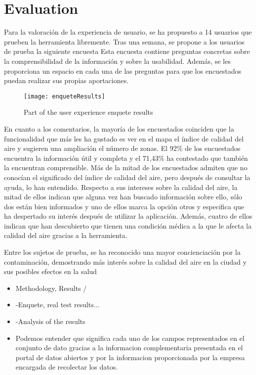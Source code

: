 \newpage
\section{Evaluation}
Para la valoración de la experiencia de usuario, se ha propuesto a 14 usuarios que prueben la herramienta libremente. 
Tras una semana, se propone a los usuarios de prueba la siguiente encuesta
Esta encuesta contiene preguntas concretas sobre la comprensibilidad de la información y sobre la usabilidad. Además, 
se les proporciona un espacio en cada una de las preguntas para que los encuestados puedan realizar sus propias aportaciones. 

\begin{figure}[ht]
   \centering
   \texttt{[image: enqueteResults]}
   \caption{Part of the user experience enquete results}
\end{figure}

En cuanto a los comentarios, la mayoría de los encuestados coinciden que la funcionalidad que más les ha gustado es ver en el 
mapa el índice de calidad del aire y sugieren una ampliación el número de zonas.
El 92\% de los encuestados encuentra la información útil y completa y el 71,43\% ha contestado que también la encuentran 
comprensible.
Más de la mitad de los encuestados admiten que no conocían el significado del índice de calidad del aire, pero después de 
consultar la ayuda, lo han entendido.
Respecto a sus intereses sobre la calidad del aire, la mitad de ellos indican que alguna vez han buscado información sobre ello, 
sólo dos están bien informados y uno de ellos marca la opción otros y especifica que ha despertado su interés después de utilizar 
la aplicación.
Además, cuatro de ellos indican que han descubierto que tienen una condición médica a la que le afecta la calidad del aire gracias 
a la herramienta.

Entre los sujetos de prueba, se ha reconocido una mayor concienciación por la contaminación, demostrando más interés sobre la 
calidad del aire en la ciudad y sus posibles efectos en la salud

\begin{itemize}
   \item  { Methodology, Results } / 
   \item   -Enquete, real test results...
   \item   -Analysis of the results   
   \item   Podemos entender  que significa cada uno de los campos representados en el conjunto de dato gracias a la 
   informacion complementaria presentada en el portal de datos abiertos y por la informacion proporcionada por la 
   empresa encargada de  recolectar los datos.
\end{itemize}
